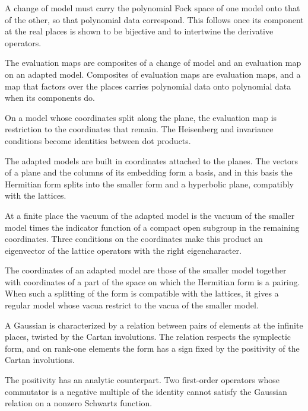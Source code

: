 A change of model must carry the polynomial Fock space of one model onto that
of the other, so that polynomial data correspond. This follows once its
component at the real places is shown to be bijective and to intertwine the
derivative operators.

The evaluation maps are composites of a change of model and an evaluation map
on an adapted model. Composites of evaluation maps are evaluation maps, and a
map that factors over the places carries polynomial data onto polynomial data
when its components do.

On a model whose coordinates split along the plane, the evaluation map is
restriction to the coordinates that remain. The Heisenberg and invariance
conditions become identities between dot products.

The adapted models are built in coordinates attached to the planes. The vectors
of a plane and the columns of its embedding form a basis, and in this basis the
Hermitian form splits into the smaller form and a hyperbolic plane, compatibly
with the lattices.

At a finite place the vacuum of the adapted model is the vacuum of the smaller
model times the indicator function of a compact open subgroup in the remaining
coordinates. Three conditions on the coordinates make this product an
eigenvector of the lattice operators with the right eigencharacter.

The coordinates of an adapted model are those of the smaller model together with
coordinates of a part of the space on which the Hermitian form is a pairing.
When such a splitting of the form is compatible with the lattices, it gives a
regular model whose vacua restrict to the vacua of the smaller model.

A Gaussian is characterized by a relation between pairs of elements at the
infinite places, twisted by the Cartan involutions. The relation respects the
symplectic form, and on rank-one elements the form has a sign fixed by the
positivity of the Cartan involutions.

The positivity has an analytic counterpart. Two first-order operators whose
commutator is a negative multiple of the identity cannot satisfy the Gaussian
relation on a nonzero Schwartz function.

